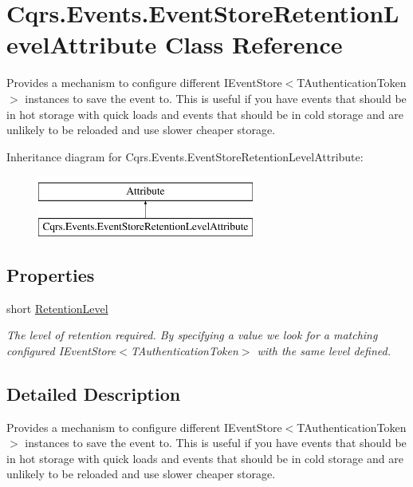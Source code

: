 \hypertarget{classCqrs_1_1Events_1_1EventStoreRetentionLevelAttribute}{}\section{Cqrs.\+Events.\+Event\+Store\+Retention\+Level\+Attribute Class Reference}
\label{classCqrs_1_1Events_1_1EventStoreRetentionLevelAttribute}


Provides a mechanism to configure different I\+Event\+Store$<$\+T\+Authentication\+Token$>$ instances to save the event to. This is useful if you have events that should be in hot storage with quick loads and events that should be in cold storage and are unlikely to be reloaded and use slower cheaper storage.  


Inheritance diagram for Cqrs.\+Events.\+Event\+Store\+Retention\+Level\+Attribute\+:\begin{figure}[H]
\begin{center}
\leavevmode
\includegraphics[height=2.000000cm]{classCqrs_1_1Events_1_1EventStoreRetentionLevelAttribute}
\end{center}
\end{figure}
\subsection*{Properties}
\begin{DoxyCompactItemize}
\item 
short \hyperlink{classCqrs_1_1Events_1_1EventStoreRetentionLevelAttribute_a02b46ba8653da7c44e39be7ee151cb2b_a02b46ba8653da7c44e39be7ee151cb2b}{Retention\+Level}
\begin{DoxyCompactList}\small\item\em The level of retention required. By specifying a value we look for a matching configured I\+Event\+Store$<$\+T\+Authentication\+Token$>$ with the same level defined. \end{DoxyCompactList}\end{DoxyCompactItemize}


\subsection{Detailed Description}
Provides a mechanism to configure different I\+Event\+Store$<$\+T\+Authentication\+Token$>$ instances to save the event to. This is useful if you have events that should be in hot storage with quick loads and events that should be in cold storage and are unlikely to be reloaded and use slower cheaper storage. 



